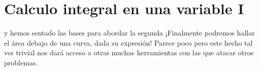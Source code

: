 \chapter{Calculo integral en una variable I} %
\label{cha:calculo_integral_en_una_variable_i}

\noindent {} y hemos
sentado las bases para abordar la segunda ¡Finalmente podremos hallar el área
debajo de una curva, dada su expresión! Parece poco pero este hecho tal ves
trivial nos dará acceso a otras muchas herramientas con las que atacar otros
problemas. 

